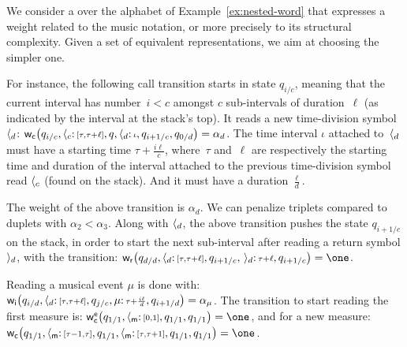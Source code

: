 \begin{example} \label{ex:SWVPA}
We consider a \SWVPA over the alphabet of Example~\ref{ex:nested-word}
that expresses a weight related to the music notation,
or more precisely to its structural complexity.
Given a set of equivalent representations, we aim at choosing the simpler one.

%
For instance, the following call transition starts in state
$q_{{i}/{c}}$, meaning that the current interval has number~$i < c$
amongst $c$ sub-intervals of duration~$\ell$ (as indicated by the interval at the stack's top).
It reads a new time-division symbol~$\langle_{d}$:
\(
{\mathsf{w}_\mathsf{c}}\bigl(q_{{i}/{c}},
           \langle_{c}\mathpunct{:}{\scriptstyle [\tau, \tau+\ell]}, q,
           \langle_{d}\mathpunct{:}{\scriptstyle \iota}, q_{{i+1}/{c}},
           q_{{0}/{d}} \bigr) = \alpha_d
\).
The time interval $\iota$ attached to~$\langle_{d}$ 
must have a starting time $\tau + \frac{i\ell}{c}$,
where~$\tau$ and~$\ell$ are respectively
the starting time and duration of the interval attached to
the previous time-division symbol read $\langle_{c}$ (found on the stack).
%
And it must have a duration $\frac{\ell}{d}$.

\noindent
The weight of the above transition is $\alpha_d$.
We can penalize \eg triplets compared to duplets with $\alpha_2 < \alpha_3$.
%
\noindent
Along with $\langle_{d}$,
the above transition pushes
the state $q_{{i+1}/{c}}$ on the stack,
in order to start the next sub-interval after reading 
a return symbol $\rangle_{d}$,
with the transition:
\(
\weir\bigl(q_{{d}/{d}},
           \ccall{d}\tstamp{[\tau, \tau+\ell]}, q_{{i+1}/{c}},
           \,\creturn{d}\tstamp{\tau + \ell}, q_{{i+1}/{c}} \bigr) = \one
\).

\noindent
Reading a musical event $\mu$ is done with:
\(
{\mathsf{w}_\mathsf{i}}\bigl(q_{{i}/{d}},
           \langle_{d}\mathpunct{:}{\scriptstyle [\tau, \tau+\ell]}, q_{{j}/{c}},
           \mu\mathpunct{:}{\scriptstyle \tau + \frac{i\ell}{d}}, q_{{i+1}/{d}} \bigr) = \alpha_\mu
\).
The transition to start reading the first measure is:
\(
\weiec\bigl(q_{1/1},
           \ccall{\mathsf{m}}\tstamp{[0, 1]}, q_{1/1},
           q_{1/1} \bigr) = \one
\),
and for a new measure:
\(
\weic\bigl(q_{1/1},
          \ccall{\mathsf{m}}\tstamp{[\tau-1, \tau]}, q_{1/1},
          \ccall{\mathsf{m}}\tstamp{[\tau, \tau+1]}, q_{1/1},
          q_{1/1} \bigr) = \one
\).
\endex
\end{example}

